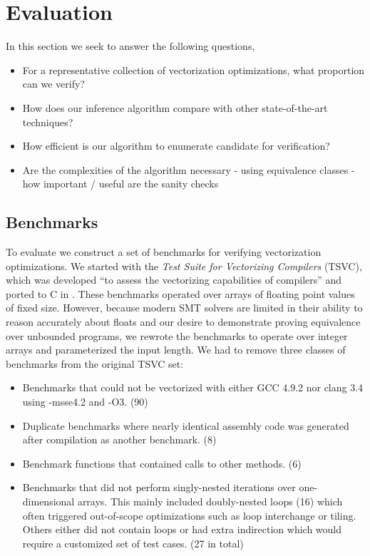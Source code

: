 \section{Evaluation}

In this section we seek to answer the following questions,

\begin{itemize}
\item For a representative collection of vectorization optimizations, what proportion can we verify?
\item How does our \bisim{} inference algorithm compare with other state-of-the-art techniques?
\item How efficient is our algorithm to enumerate candidate \bisimreps{} for verification?
\item Are the complexities of the algorithm necessary
        - using equivalence classes
        - how important / useful are the sanity checks
\end{itemize}

\subsection{Benchmarks}

To evaluate \tool{} we construct a set of benchmarks for verifying
vectorization optimizations. We started with the \emph{Test Suite
for Vectorizing Compilers} (TSVC), which was developed ``to assess
the vectorizing capabilities of compilers'' and ported to C in
\cite{TSVC}. These benchmarks operated over arrays of floating point
values of fixed size. However, because modern SMT solvers are limited
in their ability to reason accurately about floats and our desire to
demonstrate proving equivalence over unbounded programs, we rewrote
the benchmarks to operate over integer arrays and parameterized the
input length.  We had to remove three classes of benchmarks from the
original TSVC set:

\begin{itemize}
\item Benchmarks that could not be vectorized with either GCC 4.9.2 nor clang 3.4 using -msse4.2 and -O3. (90)
\item Duplicate benchmarks where nearly identical assembly code was generated after compilation as another benchmark. (8)
\item Benchmark functions that contained calls to other methods. (6)
\item Benchmarks that did not perform singly-nested iterations over
one-dimensional arrays. This mainly included doubly-nested loops
(16) which often triggered out-of-scope optimizations such as loop
interchange or tiling. Others either did not contain loops or had
extra indirection which would require a customized set of test cases.
(27 in total)
\end{itemize}

